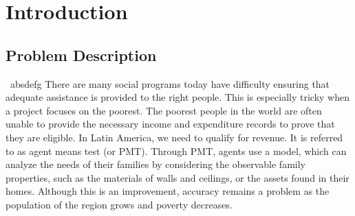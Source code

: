 \section{Introduction}\label{sec-intro}





\subsection{Problem Description}
\
absdefg
There are many social programs today have difficulty ensuring that adequate assistance is provided to the right people. This is especially tricky when a project focuses on the poorest. The poorest people in the world are often unable to provide the necessary income and expenditure records to prove that they are eligible. In Latin America, we need to qualify for revenue. It is referred to as agent means test (or PMT). Through PMT, agents use a model, which can analyze the needs of their families by considering the observable family properties, such as the materials of walls and ceilings, or the assets found in their homes. Although this is an improvement, accuracy remains a problem as the population of the region grows and poverty decreases.
\


